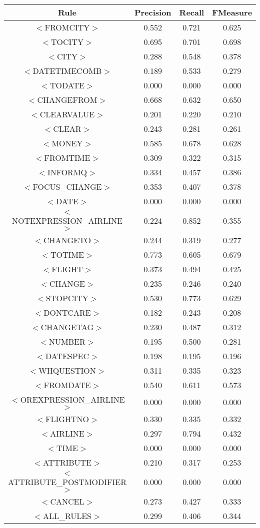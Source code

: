 \documentclass[a4paper,10pt]{article}
\begin{document}
\pagebreak
{} \label{tab:title} 
\begin{center}
\begin{tabular}{|c||c|c|c|}
\hline
Rule&Precision&Recall&FMeasure\\
\hline
\hline
$<$FROMCITY$>$&0.552&0.721&0.625 \\
\hline$<$TOCITY$>$&0.695&0.701&0.698 \\
\hline$<$CITY$>$&0.288&0.548&0.378 \\
\hline$<$DATETIMECOMB$>$&0.189&0.533&0.279 \\
\hline$<$TODATE$>$&0.000&0.000&0.000 \\
\hline$<$CHANGEFROM$>$&0.668&0.632&0.650 \\
\hline$<$CLEARVALUE$>$&0.201&0.220&0.210 \\
\hline$<$CLEAR$>$&0.243&0.281&0.261 \\
\hline$<$MONEY$>$&0.585&0.678&0.628 \\
\hline$<$FROMTIME$>$&0.309&0.322&0.315 \\
\hline$<$INFORMQ$>$&0.334&0.457&0.386 \\
\hline$<$FOCUS\_CHANGE$>$&0.353&0.407&0.378 \\
\hline$<$DATE$>$&0.000&0.000&0.000 \\
\hline$<$NOTEXPRESSION\_AIRLINE$>$&0.224&0.852&0.355 \\
\hline$<$CHANGETO$>$&0.244&0.319&0.277 \\
\hline$<$TOTIME$>$&0.773&0.605&0.679 \\
\hline$<$FLIGHT$>$&0.373&0.494&0.425 \\
\hline$<$CHANGE$>$&0.235&0.246&0.240 \\
\hline$<$STOPCITY$>$&0.530&0.773&0.629 \\
\hline$<$DONTCARE$>$&0.182&0.243&0.208 \\
\hline$<$CHANGETAG$>$&0.230&0.487&0.312 \\
\hline$<$NUMBER$>$&0.195&0.500&0.281 \\
\hline$<$DATESPEC$>$&0.198&0.195&0.196 \\
\hline$<$WHQUESTION$>$&0.311&0.335&0.323 \\
\hline$<$FROMDATE$>$&0.540&0.611&0.573 \\
\hline$<$OREXPRESSION\_AIRLINE$>$&0.000&0.000&0.000 \\
\hline$<$FLIGHTNO$>$&0.330&0.335&0.332 \\
\hline$<$AIRLINE$>$&0.297&0.794&0.432 \\
\hline$<$TIME$>$&0.000&0.000&0.000 \\
\hline$<$ATTRIBUTE$>$&0.210&0.317&0.253 \\
\hline$<$ATTRIBUTE\_POSTMODIFIER$>$&0.000&0.000&0.000 \\
\hline$<$CANCEL$>$&0.273&0.427&0.333 \\
\hline
\hline
$<$ALL\_RULES$>$&0.299&0.406&0.344 \\
\hline
\end{tabular}
\end{center}
\end{document}
